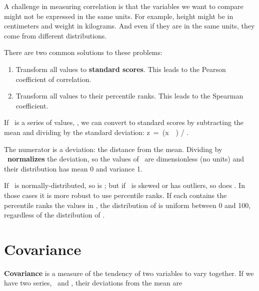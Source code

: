 \documentclass[12pt]{book}
\begin{document}
A challenge in measuring correlation is that the variables we want
to compare might not be expressed in the same units.  For example, height
might be in centimeters and weight in kilograms.  And even if they are
in the same units, they come from different distributions.

There are two common solutions to these problems:

\begin{enumerate}

\item Transform all values to {\bf standard scores}.  This leads to
the Pearson coefficient of correlation.

\item Transform all values to their percentile ranks.  This
leads to the Spearman coefficient.

\end{enumerate}

If \X~is a series of values, \xsubi, we can convert to standard
scores by subtracting the mean and dividing by the standard deviation:
z~=~(x~\minus~\mymu) / \mysigma.

The numerator is a deviation: the distance from the mean.  Dividing by
\mysigma~{\bf normalizes} the deviation, so the values of \Z~are
dimensionless (no units) and their distribution has mean 0 and
variance 1.

If \X~is normally-distributed, so is \Z; but if \X~is skewed or has
outliers, so does \Z.  In those cases it is more robust to use
percentile ranks.  If each \R contains the percentile ranks the
values in \X, the distribution of \R is uniform between 0 and 100,
regardless of the distribution of \X.

\section{Covariance}

{\bf Covariance} is a measure of the tendency of two variables
to vary together.  If we have two series, \X~and \Y, their
deviations from the mean are
\end{document}
